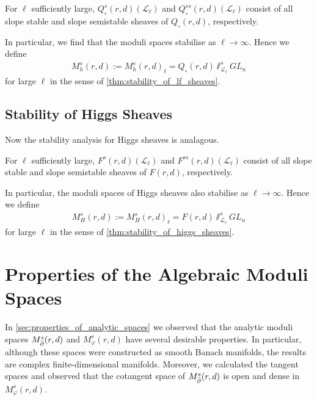 \documentclass[12pt]{ociamthesis}  %
\begin{document}
\begin{corollary}\label{thm:stability_of_lf_sheaves}
  For $\ell$ sufficiently large,
  $Q^s_\circ(r,d)(\mathscr L_\ell)$ and $Q^{ss}_\circ(r,d)(\mathscr L_\ell)$
  consist of all slope stable and slope semistable sheaves of $Q_\circ(r,d)$,
  respectively.
\end{corollary}

In particular, we find that the moduli spaces stabilise as $\ell \to \infty$.
Hence we define
\begin{align}\label{eq:plain_algebraic_space}
  M^s_h(r,d) := M^s_h(r,d)_\ell = Q_\circ(r,d)\sslash^s_{\mathscr L_\ell} GL_n
\end{align}
for large $\ell$ in the sense of \ref{thm:stability_of_lf_sheaves}.

\subsection{Stability of Higgs Sheaves}

Now the stability analysis for Higgs sheaves is analagous.
\missingsection

\begin{corollary}\label{thm:stability_of_higgs_sheaves}
  For $\ell$ sufficiently large,
  $F^s(r,d)(\mathscr L_\ell)$ and $F^{ss}(r,d)(\mathscr L_\ell)$
  consist of all slope stable and slope semistable sheaves of $F(r,d)$,
  respectively.
\end{corollary}

In particular, the moduli spaces of Higgs sheaves also stabilise as
$\ell\to\infty$. Hence we define
\begin{align}\label{eq:higgs_algebraic_space}
  M^s_H(r,d) := M^s_H(r,d)_\ell = F(r,d)\sslash^s_{\mathscr L_\ell} GL_n
\end{align}
for large $\ell$ in the sense of \ref{thm:stability_of_higgs_sheaves}.

\section{Properties of the Algebraic Moduli Spaces}

In \ref{sec:properties_of_analytic_spaces} we observed that the
analytic moduli spaces $M^s_{\bar{\partial}}(r,d)$ and $M^s_\varphi(r,d)$ have
several desirable properties. In particular, although
these spaces were constructed as smooth Banach manifolds, the results
are complex finite-dimensional manifolds. Moreover, we calculated
the tangent spaces and observed that the cotangent space of
$M^s_{\bar{\partial}}(r,d)$ is open and dense in $M^s_\varphi(r,d)$.
\end{document}
